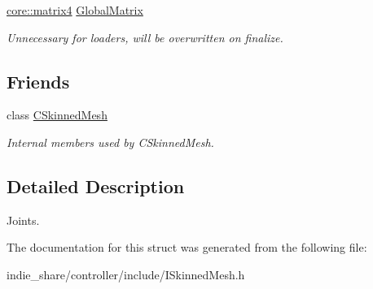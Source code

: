 \begin{DoxyCompactItemize}
\mbox{\label{structirr_1_1scene_1_1ISkinnedMesh_1_1SJoint_a633203c1f514622febdad45edd06b9a5}} 
\hyperlink{namespaceirr_1_1core_a73fa92e638c5ca97efd72da307cc9b65}{core\+::matrix4} \hyperlink{structirr_1_1scene_1_1ISkinnedMesh_1_1SJoint_a633203c1f514622febdad45edd06b9a5}{Global\+Matrix}
\begin{DoxyCompactList}\small\item\em Unnecessary for loaders, will be overwritten on finalize. \end{DoxyCompactList}\end{DoxyCompactItemize}
\subsection*{Friends}
\begin{DoxyCompactItemize}
\item 
\mbox{\label{structirr_1_1scene_1_1ISkinnedMesh_1_1SJoint_a9fe6767b50580f2235b3a86dda1e5b7c}} 
class \hyperlink{structirr_1_1scene_1_1ISkinnedMesh_1_1SJoint_a9fe6767b50580f2235b3a86dda1e5b7c}{C\+Skinned\+Mesh}
\begin{DoxyCompactList}\small\item\em Internal members used by C\+Skinned\+Mesh. \end{DoxyCompactList}\end{DoxyCompactItemize}


\subsection{Detailed Description}
Joints. 

The documentation for this struct was generated from the following file\+:\begin{DoxyCompactItemize}
\item 
indie\+\_\+share/controller/include/I\+Skinned\+Mesh.\+h\end{DoxyCompactItemize}
